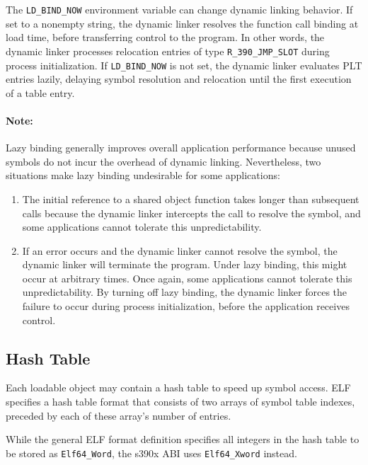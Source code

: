 \documentclass[USenglish,fontsize=11pt,twoside,%
  toc=bib,toc=idx,toc=graduated,numbers=noendperiod,
  bookmarks=true,
  bookmarksnumbered=true,
  bookmarksopen=true,
  bookmarksopenlevel=1,
  breaklinks=true,
  colorlinks=true,
  linkcolor=black,
  pdfpagelayout={TwoPageRight},
  pdfusetitle=true
]{scrreprt}
\newcommand{\NBITS}{64}
\newcommand{\ABINAME}{s390x}
\newcommand{\NBITS}{32}
\newcommand{\ABINAME}{s390}
\begin{document}
The \texttt{LD\_BIND\_NOW} environment variable can change dynamic
linking behavior.  If set to a nonempty string, the dynamic linker
resolves the function call binding at load time, before transferring
control to the program.  In other words, the dynamic linker processes
relocation entries of type \texttt{R\_390\_JMP\_SLOT} during process
initialization.  If \texttt{LD\_BIND\_NOW} is not set, the dynamic
linker evaluates PLT entries lazily, delaying symbol resolution and
relocation until the first execution of a table entry.

\paragraph{Note:}
Lazy binding generally improves overall application performance
because unused symbols do not incur the overhead of dynamic
linking.  Nevertheless, two situations make lazy binding undesirable
for some applications:
\begin{enumerate}
\item The initial reference to a shared object function takes longer
  than subsequent calls because the dynamic linker intercepts the call
  to resolve the symbol, and some applications cannot tolerate this
  unpredictability.
\item If an error occurs and the dynamic linker cannot resolve the
  symbol, the dynamic linker will terminate the program.  Under lazy
  binding, this might occur at arbitrary times.  Once again, some
  applications cannot tolerate this unpredictability.  By turning off
  lazy binding, the dynamic linker forces the failure to occur during
  process initialization, before the application receives control.
\end{enumerate}

\ifzseries

\subsection{Hash Table}
\label{hashtable}
 Each loadable object may contain a hash table to speed
up symbol access.  ELF specifies a hash table format that consists of two
arrays of symbol table indexes, preceded by each of these array's number
of entries.

While the general ELF format definition specifies all integers in the hash
table to be stored as \texttt{Elf\NBITS\_Word}, the \ABINAME{} ABI uses
\texttt{Elf\NBITS\_Xword} instead.

\fi
\end{document}
